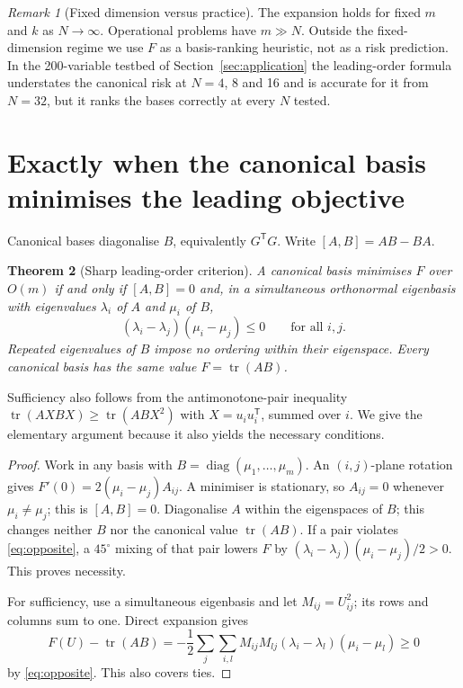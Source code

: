 \documentclass[11pt,a4paper]{article}
\numberwithin{equation}{section}
\newtheorem{theorem}{Theorem}[section]
\theoremstyle{remark}\newtheorem{remark}[theorem]{Remark}
\newcommand{\tr}{\operatorname{tr}}
\newcommand{\diag}{\operatorname{diag}}
\newcommand{\T}{^{\mathsf T}}
\begin{document}
\begin{remark}[Fixed dimension versus practice]\label{rem:regime}
The expansion holds for fixed \(m\) and \(k\) as \(N\to\infty\). Operational problems have
\(m\gg N\). Outside the fixed-dimension regime we use \(F\) as a basis-ranking heuristic, not as a
risk prediction. In the 200-variable testbed of Section~\ref{sec:application} the leading-order
formula understates the canonical risk at \(N=4\), 8 and 16 and is accurate for it from
\(N=32\), but it ranks the bases correctly at every \(N\) tested.
\end{remark}

\section{Exactly when the canonical basis minimises the leading objective}\label{sec:criterion}

Canonical bases diagonalise \(B\), equivalently \(G\T G\). Write \([A,B]=AB-BA\).

\begin{theorem}[Sharp leading-order criterion]\label{thm:criterion}
A canonical basis minimises \(F\) over \(O(m)\) if and only if \([A,B]=0\) and, in a simultaneous
orthonormal eigenbasis with eigenvalues \(\lambda_i\) of \(A\) and \(\mu_i\) of \(B\),
\begin{equation}\label{eq:opposite}
 (\lambda_i-\lambda_j)(\mu_i-\mu_j)\le0\qquad\text{for all }i,j .
\end{equation}
Repeated eigenvalues of \(B\) impose no ordering within their eigenspace. Every canonical basis
has the same value \(F=\tr(AB)\).
\end{theorem}

Sufficiency also follows from the antimonotone-pair inequality \(\tr(AXBX)\ge\tr(ABX^2)\)
\cite{MostajeranSepulchre2018,Bourin1999,Fujii2005} with \(X=u_iu_i\T\), summed over \(i\). We give the
elementary argument because it also yields the necessary conditions.

\begin{proof}
Work in any basis with \(B=\diag(\mu_1,\ldots,\mu_m)\). An \((i,j)\)-plane rotation gives
\(F'(0)=2(\mu_i-\mu_j)A_{ij}\). A minimiser is stationary, so \(A_{ij}=0\) whenever
\(\mu_i\ne\mu_j\); this is \([A,B]=0\). Diagonalise \(A\) within the eigenspaces of \(B\); this
changes neither \(B\) nor the canonical value \(\tr(AB)\). If a pair violates \eqref{eq:opposite},
a \(45^\circ\) mixing of that pair lowers \(F\) by \((\lambda_i-\lambda_j)(\mu_i-\mu_j)/2>0\). This
proves necessity.

For sufficiency, use a simultaneous eigenbasis and let \(M_{ij}=U_{ij}^2\); its rows and columns
sum to one. Direct expansion gives
\begin{equation}\label{eq:mixing}
 F(U)-\tr(AB)=-\frac12\sum_j\sum_{i,l}M_{ij}M_{lj}(\lambda_i-\lambda_l)(\mu_i-\mu_l)\ge0
\end{equation}
by \eqref{eq:opposite}. This also covers ties.
\end{proof}
\end{document}
